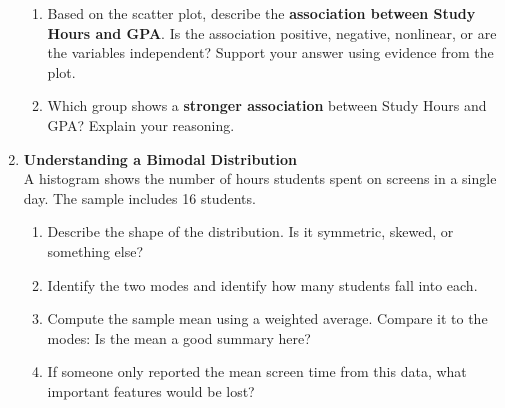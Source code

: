 \documentclass{article}
\begin{document}
\begin{enumerate}
\begin{enumerate}
    \item Based on the scatter plot, describe the \textbf{association between Study Hours and GPA}. Is the association positive, negative, nonlinear, or are the variables independent? Support your answer using evidence from the plot.
    
    \item Which group shows a \textbf{stronger association} between Study Hours and GPA? Explain your reasoning.
\end{enumerate}


\item \textbf{Understanding a Bimodal Distribution} \\
A histogram shows the number of hours students spent on screens in a single day. The sample includes 16 students.

\begin{center}
\end{center}

\begin{enumerate}
    \item Describe the shape of the distribution. Is it symmetric, skewed, or something else?
    \item Identify the two modes and identify how many students fall into each.
    \item Compute the sample mean using a weighted average. Compare it to the modes: Is the mean a good summary here?
    \item If someone only reported the mean screen time from this data, what important features would be lost?
\end{enumerate}


\end{enumerate}
\end{document}
